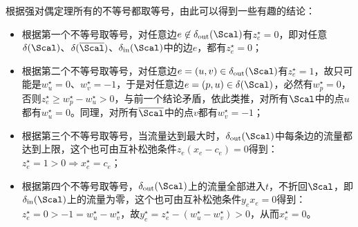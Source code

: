 \documentclass{ctexart}
\begin{document}
根据强对偶定理所有的不等号都取等号，由此可以得到一些有趣的结论：
\begin{itemize}
    \item 根据第一个不等号取等号，对任意边$e \not \in \delta_{\text{out}}(\Scal)$有$z_e^\star = 0$，即对任意$\delta(\Scal)$、$\delta(\overline{\Scal})$、$\delta_{\text{in}}(\Scal)$中的边$e$，都有$z_e^\star = 0$；
    \item 根据第二个不等号取等号，对任意边$e = (u,v) \in \delta_{\text{out}}(\Scal)$有$z_e^\star = 1$，故只可能是$w_u^\star = 0$、$w_v^\star = -1$，于是对任意边$e = (p, u) \in \delta(\Scal)$，必然有$w_p^\star = 0$，否则$z_e^\star \ge w_p^\star - w_u^\star > 0$，与前一个结论矛盾，依此类推，对所有$\Scal$中的点$u$都有$w_u^\star = 0$。同理，对所有$\overline{\Scal}$中的点$v$都有$w_v^\star = -1$；
    \item 根据第三个不等号取等号，当流量达到最大时，$\delta_{\text{out}}(\Scal)$中每条边的流量都达到上限，这个也可由互补松弛条件$z_e (x_e - c_e) = 0$得到：$z_e^\star = 1 > 0 \Longrightarrow x_e^\star = c_e$；
    \item 根据第四个不等号取等号，$\delta_{\text{out}}(\Scal)$上的流量全部进入$t$，不折回$\Scal$，即$\delta_{\text{in}}(\Scal)$上的流量为零，这个也可由互补松弛条件$y_e x_e = 0$得到：$z_e^\star = 0 > -1 = w_u^\star - w_v^\star$，故$y_e^\star = z_e^\star - (w_u^\star - w_v^\star) > 0$，从而$x_e^\star = 0$。
\end{itemize}
\end{document}
